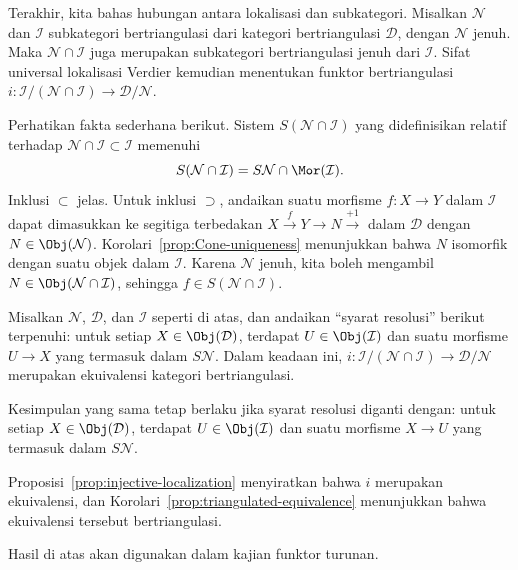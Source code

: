 Terakhir, kita bahas hubungan antara lokalisasi dan subkategori. Misalkan
$\mathcal{N}$ dan $\mathcal{I}$ subkategori bertriangulasi dari kategori
bertriangulasi $\mathcal{D}$, dengan $\mathcal{N}$ jenuh. Maka
$\mathcal{N} \cap \mathcal{I}$ juga merupakan subkategori bertriangulasi jenuh
dari $\mathcal{I}$. Sifat universal lokalisasi Verdier kemudian menentukan
funktor bertriangulasi
$i: \mathcal{I}/(\mathcal{N} \cap \mathcal{I}) \to \mathcal{D}/\mathcal{N}$.

Perhatikan fakta sederhana berikut. Sistem
$S(\mathcal{N} \cap \mathcal{I})$ yang didefinisikan relatif terhadap
$\mathcal{N} \cap \mathcal{I} \subset \mathcal{I}$ memenuhi
\begin{equation}\label{eqn:S-N-D}
	S(\mathcal{N} \cap \mathcal{I}) = S\mathcal{N} \cap \Mor(\mathcal{I}).
\end{equation}
Inklusi $\subset$ jelas. Untuk inklusi $\supset$, andaikan suatu morfisme
$f: X \to Y$ dalam $\mathcal{I}$ dapat dimasukkan ke segitiga terbedakan
$X \xrightarrow{f} Y \to N \xrightarrow{+1}$ dalam $\mathcal{D}$ dengan
$N \in \Obj(\mathcal{N})$. Korolari~\ref{prop:Cone-uniqueness} menunjukkan
bahwa $N$ isomorfik dengan suatu objek dalam $\mathcal{I}$. Karena
$\mathcal{N}$ jenuh, kita boleh mengambil
$N \in \Obj(\mathcal{N} \cap \mathcal{I})$, sehingga
$f \in S(\mathcal{N} \cap \mathcal{I})$.

\begin{proposisi}\label{prop:triangulated-i-equiv}
	Misalkan $\mathcal{N}$, $\mathcal{D}$, dan $\mathcal{I}$ seperti di atas,
	dan andaikan ``syarat resolusi'' berikut terpenuhi: untuk setiap
	$X \in \Obj(\mathcal{D})$, terdapat $U \in \Obj(\mathcal{I})$ dan suatu
	morfisme $U \to X$ yang termasuk dalam $S\mathcal{N}$. Dalam keadaan ini,
	$i: \mathcal{I}/(\mathcal{N} \cap \mathcal{I})
	\to \mathcal{D}/\mathcal{N}$ merupakan ekuivalensi kategori
	bertriangulasi.

	Kesimpulan yang sama tetap berlaku jika syarat resolusi diganti dengan:
	untuk setiap $X \in \Obj(\mathcal{D})$, terdapat
	$U \in \Obj(\mathcal{I})$ dan suatu morfisme $X \to U$ yang termasuk dalam
	$S\mathcal{N}$.
\end{proposisi}

\begin{bukti}
	Proposisi~\ref{prop:injective-localization} menyiratkan bahwa $i$ merupakan
	ekuivalensi, dan Korolari~\ref{prop:triangulated-equivalence} menunjukkan
	bahwa ekuivalensi tersebut bertriangulasi.
\end{bukti}

Hasil di atas akan digunakan dalam kajian funktor turunan.
